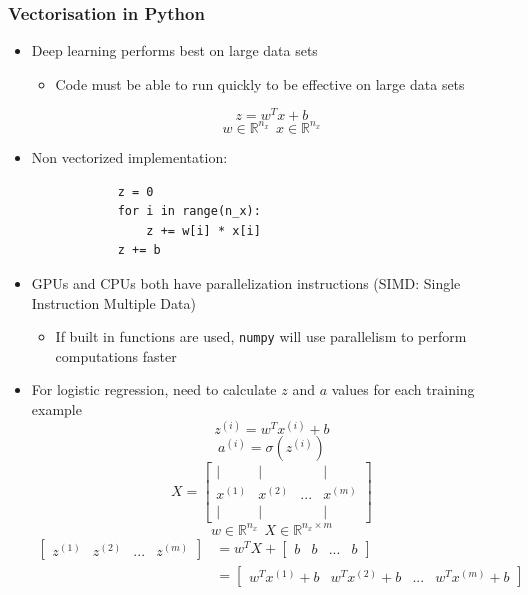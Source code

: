 \documentclass[12pt, letterpaper]{article}
\newcommand{\R}{\mathbb{R}}
\begin{document}
    \subsubsection{Vectorisation in Python}
    \begin{itemize}
        \item Deep learning performs best on large data sets
        \begin{itemize}
            \item Code must be able to run quickly to be effective on large data sets
        \end{itemize}
        $$z=w^Tx + b$$
        $$w\in \R^{n_x} ~~ x\in \R^{n_x}$$
        \item Non vectorized implementation:
        \begin{verbatim}
            z = 0
            for i in range(n_x):
                z += w[i] * x[i]
            z += b
        \end{verbatim}
        \item GPUs and CPUs both have parallelization instructions (SIMD: Single Instruction Multiple Data)
        \begin{itemize}
            \item If built in functions are used, \texttt{numpy} will use parallelism to perform computations faster 
        \end{itemize}
        \item For logistic regression, need to calculate $z$ and $a$ values for each training example
        $$z^{(i)}=w^Tx^{(i)}+b$$
        $$a^{(i)}=\sigma(z^{(i)})$$
        $$X = \begin{bmatrix}
            \mid & \mid & & \mid \\
            x^{(1)} & x^{(2)} & ... & x^{(m)} \\
            \mid & \mid & & \mid 
        \end{bmatrix} $$
        $$w\in\R^{n_x} ~~ X\in\R^{n_x\times m}$$ 
        \begin{align*}
            \begin{bmatrix}
                z^{(1)} & z^{(2)} & ... & z^{(m)}
            \end{bmatrix}
            &= w^TX + \begin{bmatrix}
                b & b & ... & b
            \end{bmatrix} \\
            &= \begin{bmatrix}
                w^Tx^{(1)}+b & w^Tx^{(2)}+b & ... & w^Tx^{(m)}+b 

\end{bmatrix}
\end{align*}
\end{itemize}
\end{document}
